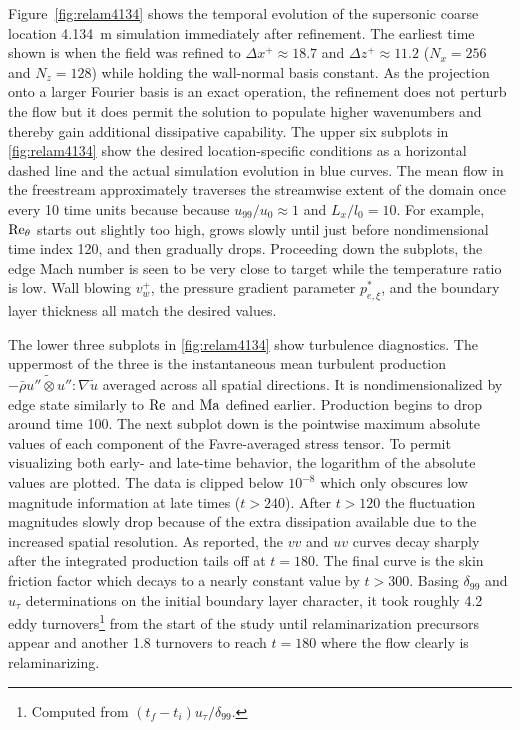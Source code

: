 Figure~\vref{fig:relam4134} shows the temporal evolution of the supersonic coarse
location 4.134~m simulation immediately after refinement.  The earliest time
shown is when the field was refined to $\Delta{}x^{+}\approx{}18.7$ and
$\Delta{}z^{+}\approx{}11.2$ ($N_x = 256$ and $N_z=128$) while holding the
wall-normal basis constant.  As the projection onto a larger Fourier basis is an
exact operation, the refinement does not perturb the flow but it does permit the
solution to populate higher wavenumbers and thereby gain additional dissipative
capability.  The upper six subplots in \autoref{fig:relam4134} show the desired
location-specific conditions as a horizontal dashed line and the actual
simulation evolution in blue curves.
%
The mean flow in the freestream approximately traverses the streamwise extent of
the domain once every 10 time units because because $u_{99}/u_0\approx{}1$ and
$L_x/l_0=10$.
%
For example, $\Reynolds[\theta]$ starts
out slightly too high, grows slowly until just before nondimensional time index 120,
and then gradually drops.  Proceeding down the subplots, the edge Mach number
is seen to be very close to target while the temperature ratio is low.  Wall
blowing $v_w^{+}$, the pressure gradient parameter $p_{e,\xi}^\ast$, and the
boundary layer thickness all match the desired values.

The lower three
subplots in \autoref{fig:relam4134} show turbulence diagnostics.
%
The uppermost of the three is the instantaneous mean turbulent production $-
\bar{\rho} \widetilde{u''\otimes{}u''} : \nabla\tilde{u}$ averaged across all
spatial directions.  It is nondimensionalized by edge state similarly to
$\Reynolds$ and $\Mach$ defined earlier.  Production begins to drop
around time 100.  The next subplot down is the pointwise maximum absolute values
of each component of the Favre-averaged stress tensor.
%
To permit visualizing both early- and late-time behavior, the logarithm of the
absolute values are plotted.   The data is clipped below $10^{-8}$ which only
obscures low magnitude information at late times ($t>240$).
%
After $t>120$ the fluctuation magnitudes slowly drop because of the
extra dissipation available due to the increased spatial
resolution.  As \citet{Cal2008Similarity} reported, the $vv$ and $uv$ curves
decay sharply after the integrated production tails off at $t=180$.  The final
curve is the skin friction factor which decays to a nearly constant value by
$t>300$.
%
Basing $\delta_{99}$ and $u_\tau$ determinations on the initial boundary layer
character, it took roughly 4.2 eddy turnovers\footnote{Computed from $(t_f - t_i) u_\tau / \delta_{99}$.}
from the start of the study until relaminarization precursors appear
and another 1.8 turnovers to reach $t=180$ where the flow
clearly is relaminarizing.

